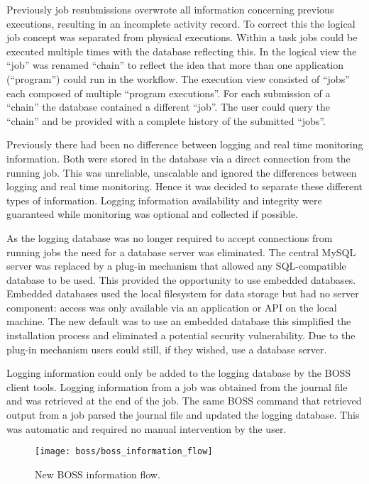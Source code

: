 Previously job resubmissions overwrote all information concerning previous executions, resulting in an incomplete activity record. To correct this the logical job concept was separated from physical executions. Within a task jobs could be executed multiple times with the database reflecting this. In the logical view the ``job'' was renamed ``chain'' to reflect the idea that more than one application (``program'') could run in the workflow. The execution view consisted of ``jobs'' each composed of multiple ``program executions''. For each submission of a ``chain'' the database contained a different ``job''. The user could query the ``chain'' and be provided with a complete history of the submitted ``jobs''.

Previously there had been no difference between logging and real time monitoring information. Both were stored in the database via a direct connection from the running job. This was unreliable, unscalable and ignored the differences between logging and real time monitoring. Hence it was decided to separate these different types of information. Logging information availability and integrity were guaranteed while monitoring was optional and collected if possible.

As the logging database was no longer required to accept connections from running jobs the need for a database server was eliminated. The central MySQL server was replaced by a plug-in mechanism that allowed any SQL-compatible database to be used. This provided the opportunity to use embedded databases. Embedded databases used the local filesystem for data storage but had no server component: access was only available via an application or API on the local machine. The new default was to use an embedded database this simplified the installation process and eliminated a potential security vulnerability. Due to the plug-in mechanism users could still, if they wished, use a database server. 

Logging information could only be added to the logging database by the BOSS client tools. Logging information from a job was obtained from the journal file and was retrieved at the end of the job. The same BOSS command that retrieved output from a job parsed the journal file and updated the logging database. This was automatic and required no manual intervention by the user.

\begin{figure}[tbp]
  \centering
  \texttt{[image: boss/boss\_information\_flow]}
  \caption{New BOSS information flow.~\cite{citeulike:880984}
  \label{fig:boss_information_flow}}
\end{figure}

